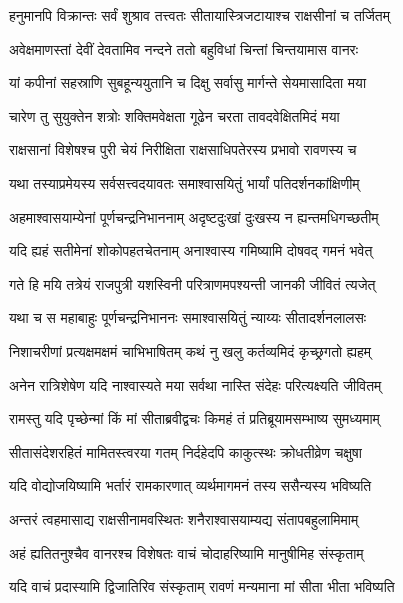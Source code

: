 
\twolineshloka
{हनुमानपि विक्रान्तः सर्वं शुश्राव तत्त्वतः}
{सीतायास्त्रिजटायाश्च राक्षसीनां च तर्जितम्} %

\twolineshloka
{अवेक्षमाणस्तां देवीं देवतामिव नन्दने}
{ततो बहुविधां चिन्तां चिन्तयामास वानरः} %

\twolineshloka
{यां कपीनां सहस्राणि सुबहून्ययुतानि च}
{दिक्षु सर्वासु मार्गन्ते सेयमासादिता मया} %

\twolineshloka
{चारेण तु सुयुक्तेन शत्रोः शक्तिमवेक्षता}
{गूढेन चरता तावदवेक्षितमिदं मया} %

\twolineshloka
{राक्षसानां विशेषश्च पुरी चेयं निरीक्षिता}
{राक्षसाधिपतेरस्य प्रभावो रावणस्य च} %

\twolineshloka
{यथा तस्याप्रमेयस्य सर्वसत्त्वदयावतः}
{समाश्वासयितुं भार्यां पतिदर्शनकांक्षिणीम्} %

\twolineshloka
{अहमाश्वासयाम्येनां पूर्णचन्द्रनिभाननाम्}
{अदृष्टदुःखां दुःखस्य न ह्यन्तमधिगच्छतीम्} %

\twolineshloka
{यदि ह्यहं सतीमेनां शोकोपहतचेतनाम्}
{अनाश्वास्य गमिष्यामि दोषवद् गमनं भवेत्} %

\twolineshloka
{गते हि मयि तत्रेयं राजपुत्री यशस्विनी}
{परित्राणमपश्यन्ती जानकी जीवितं त्यजेत्} %

\twolineshloka
{यथा च स महाबाहुः पूर्णचन्द्रनिभाननः}
{समाश्वासयितुं न्याय्यः सीतादर्शनलालसः} %

\twolineshloka
{निशाचरीणां प्रत्यक्षमक्षमं चाभिभाषितम्}
{कथं नु खलु कर्तव्यमिदं कृच्छ्रगतो ह्यहम्} %

\twolineshloka
{अनेन रात्रिशेषेण यदि नाश्वास्यते मया}
{सर्वथा नास्ति संदेहः परित्यक्ष्यति जीवितम्} %

\twolineshloka
{रामस्तु यदि पृच्छेन्मां किं मां सीताब्रवीद्वचः}
{किमहं तं प्रतिब्रूयामसम्भाष्य सुमध्यमाम्} %

\twolineshloka
{सीतासंदेशरहितं मामितस्त्वरया गतम्}
{निर्दहेदपि काकुत्स्थः क्रोधतीव्रेण चक्षुषा} %

\twolineshloka
{यदि वोद्योजयिष्यामि भर्तारं रामकारणात्}
{व्यर्थमागमनं तस्य ससैन्यस्य भविष्यति} %

\twolineshloka
{अन्तरं त्वहमासाद्य राक्षसीनामवस्थितः}
{शनैराश्वासयाम्यद्य संतापबहुलामिमाम्} %

\twolineshloka
{अहं ह्यतितनुश्चैव वानरश्च विशेषतः}
{वाचं चोदाहरिष्यामि मानुषीमिह संस्कृताम्} %

\twolineshloka
{यदि वाचं प्रदास्यामि द्विजातिरिव संस्कृताम्}
{रावणं मन्यमाना मां सीता भीता भविष्यति} %


